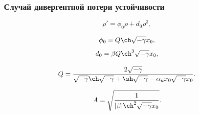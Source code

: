\documentclass[fullscreen=true, unicode, bookmarks=false]{beamer}
\begin{document}
\begin{frame}
\frametitle{ Случай дивергентной потери устойчивости }

\begin{equation}
	\rho' = \phi_0 \rho + d_0 \rho^3,
\end{equation}

\bigskip

$$ \phi_0 = Q \ch \sqrt{-\gamma} x_0 , $$
$$ d_0 = \beta Q \ch^3 \sqrt{-\gamma} x_0, $$

$$ Q = \frac{2\sqrt{-\gamma}}{\sqrt{-\gamma}\ch\sqrt{-\gamma} + \sh\sqrt{-\gamma} - \alpha_u x_0 \sqrt{-\gamma} x_0}. $$

$$ A = \sqrt{\frac{1}{|\beta| \ch^2 \sqrt{-\gamma} x_0}}. $$

\end{frame}
\end{document}
